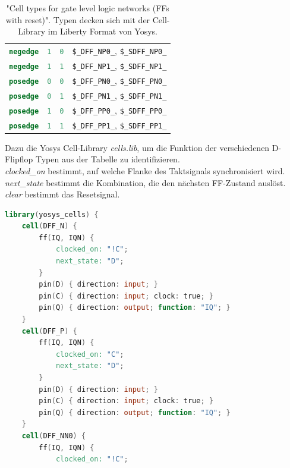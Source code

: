 \documentclass[11pt]{report}
\begin{document}
\begin{enumerate}
\begin{table}[h]
\begin{tabular}[h]{llll}
\lstinline[language=Verilog];negedge; & \lstinline[language=Verilog];1; & \lstinline[language=Verilog];0; & {\tt \$\_DFF\_NP0\_}, {\tt \$\_SDFF\_NP0\_} \\
\lstinline[language=Verilog];negedge; & \lstinline[language=Verilog];1; & \lstinline[language=Verilog];1; & {\tt \$\_DFF\_NP1\_}, {\tt \$\_SDFF\_NP1\_} \\
\lstinline[language=Verilog];posedge; & \lstinline[language=Verilog];0; & \lstinline[language=Verilog];0; & {\tt \$\_DFF\_PN0\_}, {\tt \$\_SDFF\_PN0\_} \\
\lstinline[language=Verilog];posedge; & \lstinline[language=Verilog];0; & \lstinline[language=Verilog];1; & {\tt \$\_DFF\_PN1\_}, {\tt \$\_SDFF\_PN1\_} \\
\lstinline[language=Verilog];posedge; & \lstinline[language=Verilog];1; & \lstinline[language=Verilog];0; & {\tt \$\_DFF\_PP0\_}, {\tt \$\_SDFF\_PP0\_} \\
\lstinline[language=Verilog];posedge; & \lstinline[language=Verilog];1; & \lstinline[language=Verilog];1; & {\tt \$\_DFF\_PP1\_}, {\tt \$\_SDFF\_PP1\_} \\
\end{tabular}
\caption{"Cell types for gate level logic networks (FFs with reset)". Typen decken sich mit der Cell-Library im Liberty Format von Yosys.}
\label{tab:CellLib_gates_adff}
\end{table}
Dazu die Yosys Cell-Library \textit{cells.lib}, um die Funktion der verschiedenen D-Flipflop Typen aus der Tabelle zu identifizieren.
\\
\textit{clocked\_on} bestimmt, auf welche Flanke des Taktsignals synchronisiert wird.
\\
\textit{next\_state} bestimmt die Kombination, die den nächsten FF-Zustand auslöst.
\\
\textit{clear} bestimmt das Resetsignal.
\\
\begin{lstlisting}[language=Verilog]
library(yosys_cells) {
	cell(DFF_N) {
		ff(IQ, IQN) {
			clocked_on: "!C";
			next_state: "D";
		}
		pin(D) { direction: input; }
		pin(C) { direction: input; clock: true; }
		pin(Q) { direction: output; function: "IQ"; }
	}
	cell(DFF_P) {
		ff(IQ, IQN) {
			clocked_on: "C";
			next_state: "D";
		}
		pin(D) { direction: input; }
		pin(C) { direction: input; clock: true; }
		pin(Q) { direction: output; function: "IQ"; }
	}
	cell(DFF_NN0) {
		ff(IQ, IQN) {
			clocked_on: "!C";

\end{lstlisting}
\end{enumerate}
\end{document}
